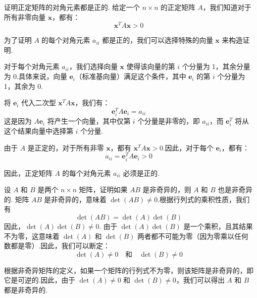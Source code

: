 \begin{tcolorbox}[enhanced,colback=10,colframe=9,breakable,coltitle=green!25!black,title=2024]
  
证明正定矩阵的对角元素都是正的.
\tcblower
给定一个 \( n \times n \) 的正定矩阵 \( A \)，我们知道对于所有非零向量 \( \mathbf{x} \)，都有：
\[
\mathbf{x}^T A \mathbf{x} > 0
\]

为了证明 \( A \) 的每个对角元素 \( a_{ii} \) 都是正的，我们可以选择特殊的向量 \( \mathbf{x} \) 来构造证明.

对于每个对角元素 \( a_{ii} \)，我们选择向量 \( \mathbf{x} \) 使得该向量的第 \( i \) 个分量为 1，其余分量为 0.具体来说，向量 \( \mathbf{e}_i \)（标准基向量）满足这个条件，其中 \( \mathbf{e}_i \) 的第 \( i \) 个分量为 1，其余为 0.

将 \( \mathbf{e}_i \) 代入二次型 \( \mathbf{x}^T A \mathbf{x} \)，我们有：
\[
\mathbf{e}_i^T A \mathbf{e}_i = a_{ii}
\]
这是因为 \( A \mathbf{e}_i \) 将产生一个向量，其中仅第 \( i \) 个分量是非零的，即 \( a_{ii} \)，而 \( \mathbf{e}_i^T \) 将从这个结果向量中选择第 \( i \) 个分量.

由于 \( A \) 是正定的，对于所有非零 \( \mathbf{x} \)，都有 \( \mathbf{x}^T A \mathbf{x} > 0 \).因此，对于每个 \( \mathbf{e}_i \)，都有：
\[
a_{ii} = \mathbf{e}_i^T A \mathbf{e}_i > 0
\]

因此，正定矩阵 \( A \) 的每个对角元素 \( a_{ii} \) 必须是正的.

\end{tcolorbox}


\begin{tcolorbox}[enhanced,colback=10,colframe=9,breakable,coltitle=green!25!black,title=2024]
  
设 $A$ 和 $B$ 是两个 $n\times n$ 矩阵，证明如果 $AB$ 是非奇异的，则 $A$ 和 $B$ 也是非奇异的.
\tcblower
矩阵 \(AB\) 是非奇异的，意味着 \(\det(AB) \neq 0\).根据行列式的乘积性质，我们有
\[
\det(AB) = \det(A) \det(B)
\]
因此，\(\det(A) \det(B) \neq 0\). 由于 \(\det(A) \det(B)\) 是一个乘积，且其结果不为零，这意味着 \(\det(A)\) 和 \(\det(B)\) 两者都不可能为零（因为零乘以任何数都是零）.因此，我们可以断定：
\[
\det(A) \neq 0 \quad \text{和} \quad \det(B) \neq 0
\]

根据非奇异矩阵的定义，如果一个矩阵的行列式不为零，则该矩阵是非奇异的，即它是可逆的.因此，由于 \(\det(A) \neq 0\) 和 \(\det(B) \neq 0\)，我们可以得出 \(A\) 和 \(B\) 都是非奇异的.

\end{tcolorbox}

